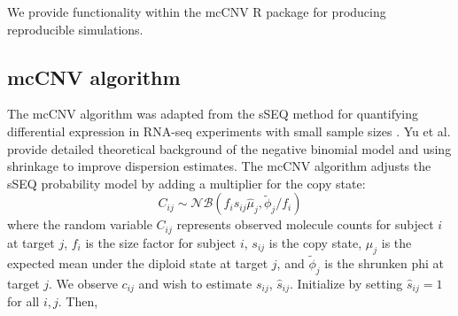 \documentclass{article}\usepackage[]{graphicx}\usepackage[]{color}
\begin{document}
We provide functionality within the mcCNV R package for producing reproducible simulations.

\subsection{mcCNV algorithm}

The mcCNV algorithm was adapted from the sSEQ method for quantifying differential expression in RNA-seq experiments with small sample sizes \cite{yu:2013aa}.
Yu et al. provide detailed theoretical background of the negative binomial model and using shrinkage to improve dispersion estimates.
The mcCNV algorithm adjusts the sSEQ probability model by adding a multiplier for the copy state:
\begin{equation}
  C_{ij} \sim \mathcal{NB}(f_is_{ij}\hat\mu_j, \tilde\phi_j/f_i)
\end{equation}
where the random variable $C_{ij}$ represents observed molecule counts for subject $i$ at target $j$, $f_i$ is the size factor for subject $i$, $s_{ij}$ is the copy state, $\mu_j$ is the expected mean under the diploid state at target $j$, and $\tilde\phi_j$ is the shrunken phi at target $j$.
We observe $c_{ij}$ and wish to estimate $s_{ij}$, $\hat{s}_{ij}$.
Initialize by setting $\hat{s}_{ij} = 1$ for all $i,j$. Then,
\end{document}
